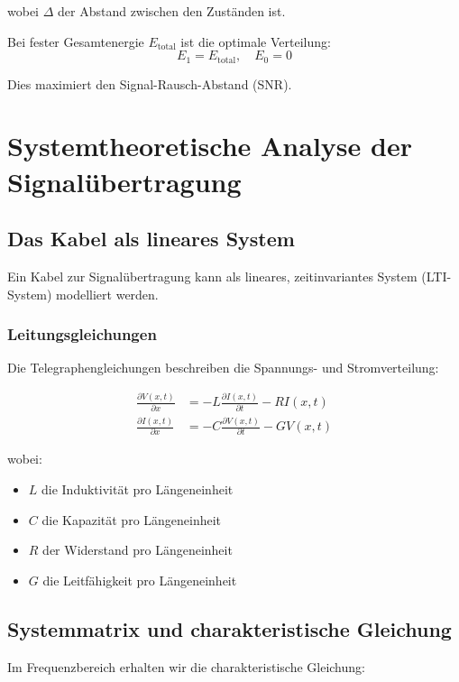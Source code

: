 ﻿\documentclass[12pt,a4paper]{article}
\theoremstyle{definition}
\theoremstyle{remark}
\begin{document}
wobei $\Delta$ der Abstand zwischen den Zuständen ist.

Bei fester Gesamtenergie $E_{\text{total}}$ ist die optimale Verteilung:
\begin{equation}
E_1 = E_{\text{total}}, \quad E_0 = 0
\end{equation}

Dies maximiert den Signal-Rausch-Abstand (SNR).

\section{Systemtheoretische Analyse der Signalübertragung}

\subsection{Das Kabel als lineares System}

Ein Kabel zur Signalübertragung kann als lineares, zeitinvariantes System (LTI-System) modelliert werden.

\subsubsection{Leitungsgleichungen}

Die Telegraphengleichungen beschreiben die Spannungs- und Stromverteilung:

\begin{align}
\frac{\partial V(x,t)}{\partial x} &= -L \frac{\partial I(x,t)}{\partial t} - R I(x,t) \\
\frac{\partial I(x,t)}{\partial x} &= -C \frac{\partial V(x,t)}{\partial t} - G V(x,t)
\end{align}

wobei:
\begin{itemize}
\item $L$ die Induktivität pro Längeneinheit
\item $C$ die Kapazität pro Längeneinheit
\item $R$ der Widerstand pro Längeneinheit
\item $G$ die Leitfähigkeit pro Längeneinheit
\end{itemize}

\subsection{Systemmatrix und charakteristische Gleichung}

Im Frequenzbereich erhalten wir die charakteristische Gleichung:
\end{document}
